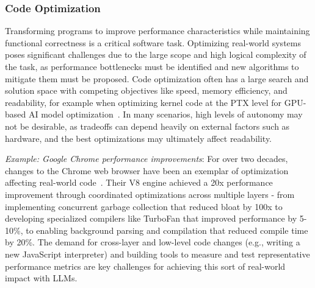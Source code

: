 % 
% 


\subsubsection{Code Optimization}

Transforming programs to improve performance characteristics while maintaining functional correctness is a critical software task. Optimizing real-world systems poses significant challenges due to the large scope and high logical complexity of the task, as performance bottlenecks must be identified and new algorithms to mitigate them must be proposed. Code optimization often has a large search and solution space with competing objectives like speed, memory efficiency, and readability, for example when optimizing kernel code at the PTX level for GPU-based AI model optimization~\citep{deepep2025, ouyang2024kernelbench}. In many scenarios, high levels of autonomy may not be desirable, as tradeoffs can depend heavily on external factors such as hardware, and the best optimizations may ultimately affect readability.

% 

\begin{tcolorbox}[colback=lightblue, boxrule=0pt, arc=5pt, outer arc=5pt]
\textit{Example: Google Chrome performance improvements}: For over two decades, changes to the Chrome web browser have been an exemplar of optimization affecting real-world code~\citep{chromium10years}. Their V8 engine achieved a 20x performance improvement through coordinated optimizations across multiple layers - from implementing concurrent garbage collection that reduced bloat by 100x to developing specialized compilers like TurboFan that improved performance by 5-10\%, to enabling background parsing and compilation that reduced compile time by 20\%. The demand for cross-layer and low-level code changes (e.g., writing a new JavaScript interpreter) and building tools to measure and test representative performance metrics are key challenges for achieving this sort of real-world impact with LLMs.
\end{tcolorbox}



